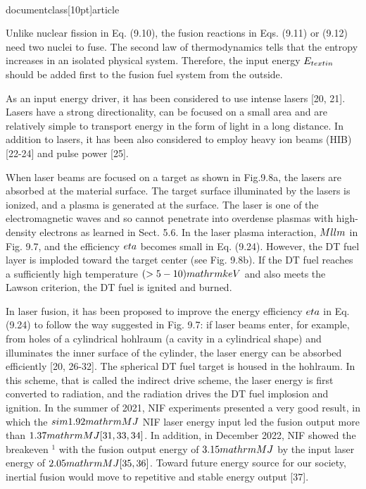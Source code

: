 \\documentclass[10pt]{article}
\begin{document}
{{{{{{Unlike nuclear fission in Eq. (9.10), the fusion reactions in Eqs. (9.11) or (9.12) need two nuclei to fuse. The second law of thermodynamics tells that the entropy increases in an isolated physical system. Therefore, the input energy $E_{\\text {in }}$ should be added first to the fusion fuel system from the outside.

As an input energy driver, it has been considered to use intense lasers [20, 21]. Lasers have a strong directionality, can be focused on a small area and are relatively simple to transport energy in the form of light in a long distance. In addition to lasers, it has been also considered to employ heavy ion beams (HIB) [22-24] and pulse power [25].

When laser beams are focused on a target as shown in Fig.9.8a, the lasers are absorbed at the material surface. The target surface illuminated by the lasers is ionized, and a plasma is generated at the surface. The laser is one of the electromagnetic waves and so cannot penetrate into overdense plasmas with high-density electrons as learned in Sect. 5.6. In the laser plasma interaction, $M \\ll m$ in Fig. 9.7, and the efficiency $\\eta$ becomes small in Eq. (9.24). However, the DT fuel layer is imploded toward the target center (see Fig. 9.8b). If the DT fuel reaches a sufficiently high temperature $(>5-10) \\mathrm{keV}$ and also meets the Lawson criterion, the DT fuel is ignited and burned.

In laser fusion, it has been proposed to improve the energy efficiency $\\eta$ in Eq. (9.24) to follow the way suggested in Fig. 9.7: if laser beams enter, for example, from holes of a cylindrical hohlraum (a cavity in a cylindrical shape) and illuminates the inner surface of the cylinder, the laser energy can be absorbed efficiently [20, 26-32]. The spherical DT fuel target is housed in the hohlraum. In this scheme, that is called the indirect drive scheme, the laser energy is first converted to radiation, and the radiation drives the DT fuel implosion and ignition. In the summer of 2021, NIF experiments presented a very good result, in which the $\\sim 1.92 \\mathrm{MJ}$ NIF laser energy input led the fusion output more than $1.37 \\mathrm{MJ}[31,33,34]$. In addition, in December 2022, NIF showed the breakeven ${ }^{1}$ with the fusion output energy of $3.15 \\mathrm{MJ}$ by the input laser energy of $2.05 \\mathrm{MJ}[35,36]$. Toward future energy source for our society, inertial fusion would move to repetitive and stable energy output [37].

}}}}}}
\end{document}
